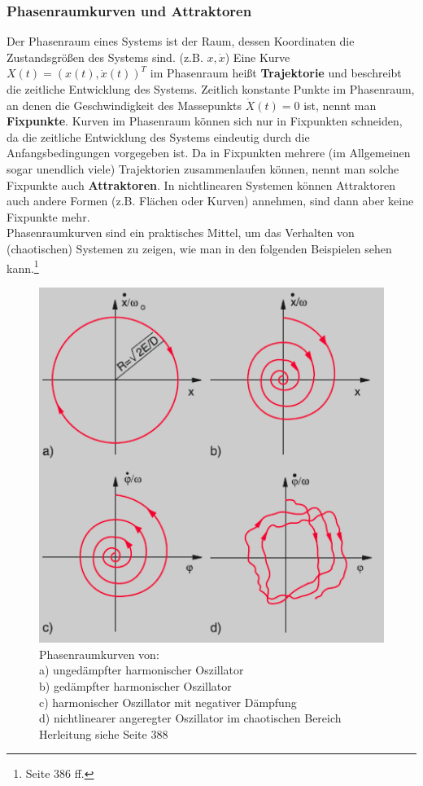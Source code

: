 \subsubsection{Phasenraumkurven und Attraktoren}
Der Phasenraum eines Systems ist der Raum, dessen Koordinaten die Zustandsgrößen des Systems sind. (z.B. $x, \dot{x}$) Eine Kurve $X(t) = (x(t), \dot{x}(t))^T$ im Phasenraum heißt \textbf{Trajektorie} und beschreibt die zeitliche Entwicklung des Systems. Zeitlich konstante Punkte im Phasenraum, an denen die Geschwindigkeit des Massepunkts $\dot{X}(t) = 0$  ist, nennt man \textbf{Fixpunkte}. Kurven im Phasenraum können sich nur in Fixpunkten schneiden, da die zeitliche Entwicklung des Systems eindeutig durch die Anfangsbedingungen vorgegeben ist. Da in Fixpunkten mehrere (im Allgemeinen sogar unendlich viele) Trajektorien zusammenlaufen können, nennt man solche Fixpunkte auch \textbf{Attraktoren}. In nichtlinearen Systemen können Attraktoren auch andere Formen (z.B. Flächen oder Kurven) annehmen, sind dann aber keine Fixpunkte mehr.
\\
Phasenraumkurven sind ein praktisches Mittel, um das Verhalten von (chaotischen) Systemen zu zeigen, wie man in den folgenden Beispielen sehen kann.\footnote{\cite{troeder} Seite 386 ff.}

\begin{figure}
\includegraphics[width=1.0\textwidth]{images/phasenraum1.png}
\caption{Phasenraumkurven von: \\a) ungedämpfter harmonischer Oszillator \\b) gedämpfter harmonischer Oszillator \\c) harmonischer Oszillator mit negativer Dämpfung \\d) nichtlinearer angeregter Oszillator im chaotischen Bereich \\Herleitung siehe \cite{troeder} Seite 388}
\end{figure}

